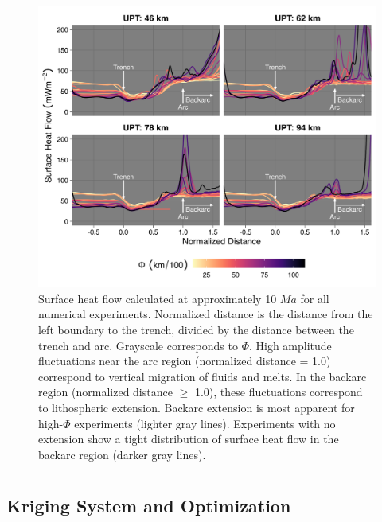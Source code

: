 \begin{figure}[htbp]

{\centering \includegraphics[width=1\linewidth,]{assets/figs/chpt2/figA7} 

}

\caption[Surface heat flow for all numerical experiments]{Surface heat flow calculated at approximately 10 $Ma$ for all numerical experiments. Normalized distance is the distance from the left boundary to the trench, divided by the distance between the trench and arc. Grayscale corresponds to $\Phi$. High amplitude fluctuations near the arc region (normalized distance = 1.0) correspond to vertical migration of fluids and melts. In the backarc region (normalized distance $\geq$ 1.0), these fluctuations correspond to lithospheric extension. Backarc extension is most apparent for high-$\Phi$ experiments (lighter gray lines). Experiments with no extension show a tight distribution of surface heat flow in the backarc region (darker gray lines).}\label{fig:hf}
\end{figure}

\cleardoublepage


\hypertarget{section-1}{%
\chapter{}\label{section-1}}

\hypertarget{krigeOpt}{%
\section{Kriging System and Optimization}\label{krigeOpt}}

